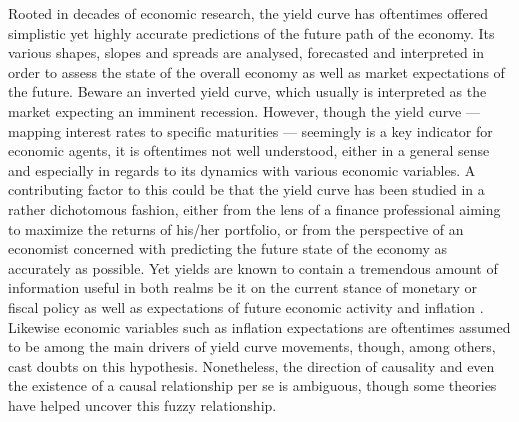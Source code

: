 Rooted in decades of economic research, the yield curve has oftentimes offered simplistic yet highly accurate predictions of the future path of the economy. 
Its various shapes, slopes and spreads are analysed, forecasted and interpreted in order to assess the state of the overall economy as well as market expectations of the future.
Beware an inverted yield curve, which usually is interpreted as the market expecting an imminent recession. 
However, though the yield curve --- mapping interest rates to specific maturities --- seemingly is a key indicator for economic agents, it is oftentimes not well understood, either in a general sense and especially in regards to its dynamics with various economic variables.
A contributing factor to this could be that the yield curve has been studied in a rather dichotomous fashion, either from the lens of a finance professional aiming to maximize the returns of his/her portfolio, or from the perspective of an economist concerned with predicting the future state of the economy as accurately as possible. 
Yet yields are known to contain a tremendous amount of information useful in both realms be it on the current stance of monetary or fiscal policy as well as expectations of future economic activity and inflation \citep{evans2007economic}.
Likewise economic variables such as inflation expectations are oftentimes assumed to be among the main drivers of yield curve movements, though, among others, \citet{Gomez-Cram_2020} cast doubts on this hypothesis. 
Nonetheless, the direction of causality and even the existence of a causal relationship per se is ambiguous, though some theories have helped uncover this fuzzy relationship. 

